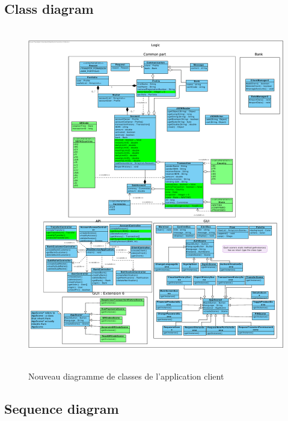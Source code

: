 \documentclass[]{report}
\begin{document}
\newpage

\subsection{Class diagram}



\begin{figure}[h!]
\hspace{1.25cm}
\hbox{
	\centering\includegraphics[scale=0.6]{img/Class Client - Extension 6.pdf}
}
\caption{Nouveau diagramme de classes de l'application client}
\end{figure}

\newpage

\subsection{Sequence diagram}
\end{document}
